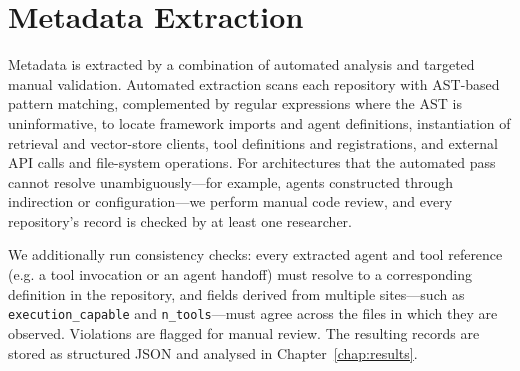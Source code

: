 \section{Metadata Extraction}
\label{sec:extraction-methodology}
 
Metadata is extracted by a combination of automated analysis and targeted manual validation. Automated extraction scans each repository with AST-based pattern matching, complemented by regular expressions where the AST is uninformative, to locate framework imports and agent definitions, instantiation of retrieval and vector-store clients, tool definitions and registrations, and external API calls and file-system operations. For architectures that the automated pass cannot resolve unambiguously---for example, agents constructed through indirection or configuration---we perform manual code review, and every repository's record is checked by at least one researcher. 

We additionally run consistency checks: every extracted agent and tool reference (e.g. a tool invocation or an agent handoff) must resolve to a corresponding definition in the repository, and fields derived from multiple sites—such as \texttt{execution\_capable} and \texttt{n\_tools}—must agree across the files in which they are observed. Violations are flagged for manual review.
The resulting records are stored as structured JSON and analysed in Chapter~\ref{chap:results}.


